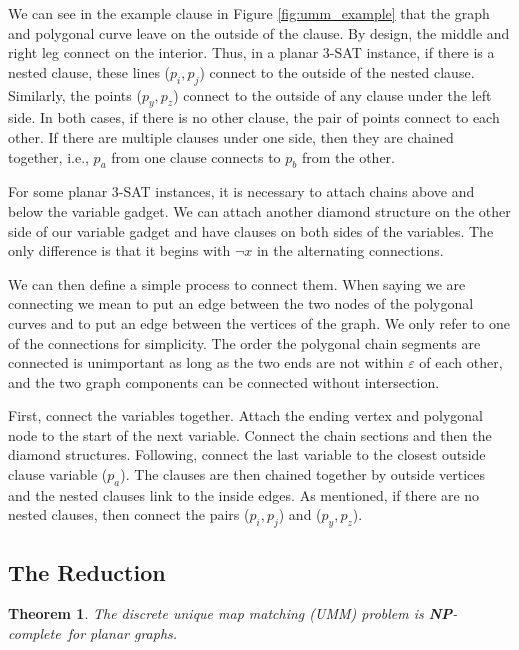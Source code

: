 \documentclass{article}[11pt]
\newcommand{\npc}{\textbf{NP}-complete}
\newtheorem{theorem}{Theorem}
\begin{document}
We can see in the example clause in Figure \ref{fig:umm_example} that the graph and polygonal curve leave
on the outside of the clause.  By design, the middle and right leg connect on the interior.  Thus, in
a planar 3-SAT instance, if there is a nested clause, these lines ($p_i,p_j$) connect to the outside of the nested clause.
Similarly, the points ($p_y,p_z$) connect to the outside of any clause under the left side.  In both cases,
if there is no other clause, the pair of points connect to each other.
If there are multiple clauses under one side, then they are chained together, 
i.e., $p_a$ from one clause connects to $p_b$ from the other.

For some planar 3-SAT instances, it is necessary to attach chains above and below the variable gadget.
We can attach another diamond structure on the other side of our variable gadget and have
clauses on both sides of the variables. The only difference is that it begins with $\lnot x$ in the alternating connections.

We can then define a simple process to connect them.  When saying we are connecting we mean to put
an edge between the two nodes of the polygonal curves and to put an edge between the vertices of the
graph.  We only refer to one of the connections for simplicity.
The order the polygonal chain segments are connected is unimportant as long as the two ends are not within $\varepsilon$ of
each other, and the two graph components can be connected without intersection.

First, connect the variables together. Attach the ending vertex and polygonal node to the 
start of the next variable.  Connect the chain sections and then the diamond structures.
Following, connect the last variable to the closest outside clause variable ($p_a$).  
The clauses are then chained together by outside vertices and the nested clauses link to the inside edges.  
As mentioned, if there are no nested clauses, then connect the pairs ($p_i,p_j$) and ($p_y,p_z$). 




\subsection{The Reduction}

\begin{theorem} \label{thm:ummck}
    The discrete unique map matching (UMM) problem is \npc\ for planar graphs.
\end{theorem}
\end{document}

